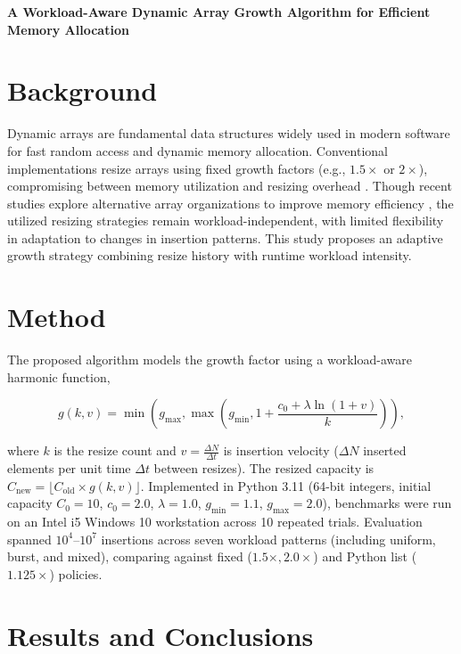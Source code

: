 \documentclass[11pt]{article}
\begin{document}
\begin{center}

{\Large\bfseries
A Workload-Aware Dynamic Array Growth Algorithm for Efficient Memory Allocation
}

\end{center}

\section*{Background}

Dynamic arrays are fundamental data structures widely used in modern software
for fast \mbox{random} access and dynamic memory allocation. Conventional
implementations resize arrays using fixed growth factors (e.g., $1.5\times$
or $2\times$), compromising between memory utilization and \mbox{resizing} \mbox{overhead}
\cite{brodnik}. Though recent studies explore alternative array organizations
to \mbox{improve} \mbox{memory} \mbox{efficiency} \cite{sartor,bille}, the utilized resizing
strategies remain workload-independent, with \mbox{limited} \mbox{flexibility} in adaptation
to changes in insertion patterns. This study proposes an \mbox{adaptive} growth
strategy combining resize history with runtime workload intensity.

\section*{Method}

The proposed algorithm models the growth factor using a workload-aware
harmonic function,

\[
g(k,v)=
\min\left(
g_{\max},
\max\left(
g_{\min},
1+\frac{c_0+\lambda\ln(1+v)}{k}
\right)
\right),
\]

\noindent where $k$ is the resize count and $v = \frac{\Delta N}{\Delta t}$ is
insertion velocity ($\Delta N$ inserted elements per unit time $\Delta t$
between resizes). The resized capacity is $C_{\mathrm{new}} = \lfloor
C_{\mathrm{old}} \times g(k,v) \rfloor$. Implemented in Python 3.11 (64-bit
integers, initial capacity $C_0=10$, $c_0=2.0$, $\lambda=1.0$, $g_{\min}=1.1$,
$g_{\max}=2.0$), benchmarks were run on an Intel i5 Windows 10 workstation
across 10 repeated trials. Evaluation spanned $10^4$--$10^7$ insertions across
seven workload patterns (including uniform, burst, and mixed), comparing
against fixed ($1.5\times, 2.0\times$) and Python list ($1.125\times$)
policies.

\section*{Results and Conclusions}
\end{document}
